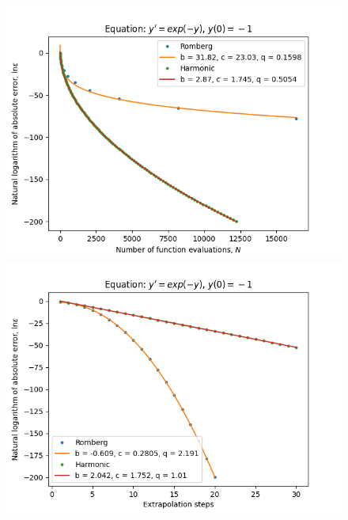 \begin{figure}[H]
\centering
\begin{minipage}{0.45\textwidth}
\centering
\includegraphics[scale=0.45]{../results/emr_plots/ln_em1_hp_trend.png}
\end{minipage}
\begin{minipage}{0.45\textwidth}
\centering
\includegraphics[scale=0.45]{../results/emr_plots/ln_em1_hp_steps.png}
\end{minipage}
\end{figure}

